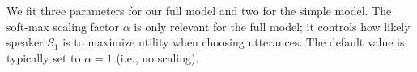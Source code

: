 \documentclass[11pt,a4paper]{article}
\begin{document}
We fit three parameters for our full model and two for the simple model.
The soft-max scaling factor $\alpha$ is only relevant for the full model;
it  controls how likely speaker $S_1$ is to maximize utility when choosing utterances. 
The default value is typically set to $\alpha=1$ (i.e., no scaling). 
\end{document}
